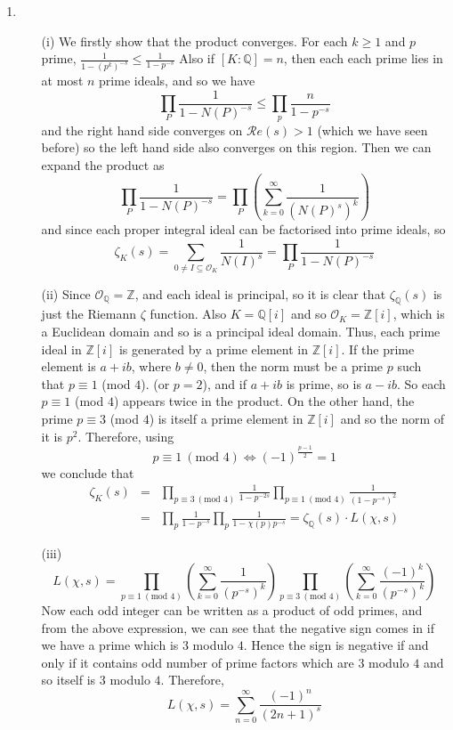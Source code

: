 \begin{enumerate}
\item
\begin{enumerate}
\item[(i)] We firstly show that the product converges. For each $k \ge 1$ and $p$ prime,
$\frac{1}{1-(p^k)^{-s}} \le \frac{1}{1-p^{-s}}$
Also if $[K:\mathbb{Q}]=n$, then each each prime lies in at most $n$ prime ideals, and so
we have
$$\prod_{P} \frac{1}{1-N(P)^{-s}} \le \prod_{p} \frac{n}{1-p^{-s}}$$
and the right hand side converges on $\mathcal{R}e(s)>1$ (which we have seen before) so the left hand side also converges on this region. Then we can expand the product as
$$\prod_{P}\frac{1}{1-N(P)^{-s}}=\prod_{P}\left(\sum_{k=0}^\infty \frac{1}{(N(P)^s)^k}\right)$$
and since each proper integral ideal can be factorised into prime ideals, so
$$\zeta_K(s)=\sum_{0 \neq I \subseteq \mathcal{O}_K} \frac{1}{N(I)^s}=\prod_{P}\frac{1}{1-N(P)^{-s}}$$
\item[(ii)] Since $\mathcal{O}_\mathbb{Q}=\mathbb{Z}$, and each ideal is principal, so it is clear that
$\zeta_\mathbb{Q}(s)$ is just the Riemann $\zeta$ function. Also $K=\mathbb{Q}[i]$ and so
$\mathcal{O}_K=\mathbb{Z}[i]$, which is a Euclidean domain and so is a principal ideal domain. Thus, each prime ideal in $\mathbb{Z}[i]$ is generated by a prime element in $\mathbb{Z}[i]$. If the prime element is $a+ib$, where $b \neq 0$, then the norm must be a prime $p$ such that $p \equiv 1$ (mod $4$). (or $p=2$), and if
$a+ib$ is prime, so is $a-ib$. So each $p \equiv 1$ (mod $4$) appears twice in the product. On the other hand,
the prime $p \equiv 3$ (mod $4$) is itself a prime element in $\mathbb{Z}[i]$ and so the norm of it is
$p^2$. Therefore, using
$$p \equiv 1~(\text{mod } 4) \iff (-1)^{\frac{p-1}{2}}=1$$
we conclude that
\begin{eqnarray*}
\zeta_K(s)&=&\prod_{p \equiv 3~(\text{mod }4)} \frac{1}{1-p^{-2s}} \prod_{p \equiv 1~(\text{mod }4)}\frac{1}{(1-p^{-s})^2}\\
&=&\prod_{p}\frac{1}{1-p^{-s}} \prod_{p}\frac{1}{1-\chi(p)p^{-s}} = \zeta_\mathbb{Q}(s)\cdot L(\chi,s)
\end{eqnarray*}
\item[(iii)]
$$L(\chi,s)=\prod_{p \equiv 1~(\text{mod }4)}\left(\sum_{k=0}^\infty \frac{1}{(p^{-s})^k}\right)
\prod_{p \equiv 3~(\text{mod }4)}\left(\sum_{k=0}^\infty \frac{(-1)^k}{(p^{-s})^k}\right)$$
Now each odd integer can be written as a product of odd primes, and from the above expression, we can see that
the negative sign comes in if we have a prime which is $3$ modulo $4$. Hence the sign is negative if and only if it contains odd number of prime factors which are $3$ modulo $4$ and so itself is $3$ modulo $4$. Therefore,
$$L(\chi,s)=\sum_{n=0}^\infty \frac{(-1)^n}{(2n+1)^s}$$
\end{enumerate}
\end{enumerate}

